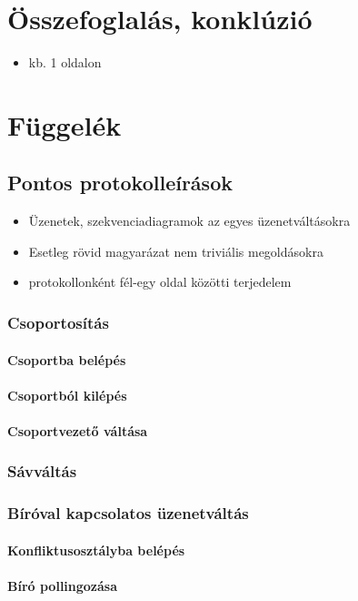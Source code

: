 \documentclass{report}
\begin{document}
	\chapter{Összefoglalás, konklúzió}
		\begin{itemize}
			\item kb. 1 oldalon
		\end{itemize}
	\chapter{Függelék}
		\section{Pontos protokolleírások}
			\begin{itemize}
				\item Üzenetek, szekvenciadiagramok az egyes üzenetváltásokra
				\item Esetleg rövid magyarázat nem triviális megoldásokra
				\item protokollonként fél-egy oldal közötti terjedelem
			\end{itemize}
			\subsection{Csoportosítás}
				\subsubsection{Csoportba belépés}
				\subsubsection{Csoportból kilépés}
				\subsubsection{Csoportvezető váltása}
			\subsection{Sávváltás}
			\subsection{Bíróval kapcsolatos üzenetváltás}
				\subsubsection{Konfliktusosztályba belépés}
				\subsubsection{Bíró pollingozása}
\end{document}
